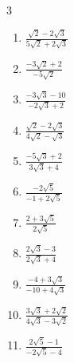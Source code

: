\begin{multicols}{3}
\begin{enumerate}
  \item $\displaystyle \frac{\sqrt{2}-2\sqrt{3}}{5\sqrt{2}+2\sqrt{3}}$


\columnbreak %

  \item $\displaystyle \frac{-3\sqrt{2}+2}{-5\sqrt{2}}$


  \item $\displaystyle \frac{-3\sqrt{3}-10}{-2\sqrt{3}+2}$


  \item $\displaystyle \frac{\sqrt{2}-2\sqrt{3}}{4\sqrt{2}-\sqrt{3}}$


  \item $\displaystyle \frac{-5\sqrt{3}+2}{3\sqrt{3}+4}$


  \item $\displaystyle \frac{-2\sqrt{5}}{-1+2\sqrt{5}}$


\columnbreak %

\resetques

  \item $\displaystyle \frac{2+3\sqrt{5}}{2\sqrt{5}}$


  \item $\displaystyle \frac{2\sqrt{3}-3}{2\sqrt{3}+4}$


  \item $\displaystyle \frac{-4+3\sqrt{3}}{-10+4\sqrt{3}}$


  \item $\displaystyle \frac{3\sqrt{3}+2\sqrt{2}}{4\sqrt{3}-3\sqrt{2}}$


  \item $\displaystyle \frac{2\sqrt{5}-1}{-2\sqrt{5}-4}$


\end{enumerate}
\end{multicols}
